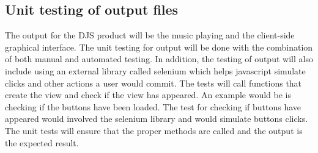 \documentclass[12pt, titlepage]{article}
\begin{document}
\subsection{Unit testing of output files}		
The output for the DJS product will be the music playing and the client-side graphical interface. The unit testing for output will be done with the combination of both manual and automated testing. In addition, the testing of output will also include using an external library called selenium which helps javascript simulate clicks and other actions a user would commit. The tests will call functions that create the view and check if the view has appeared. An example would be is checking if the buttons have been loaded. The test for checking if buttons have appeared would involved the selenium library and would simulate buttons clicks. The unit tests will ensure that the proper methods are called and the output is the expected result. 




\newpage
\end{document}
